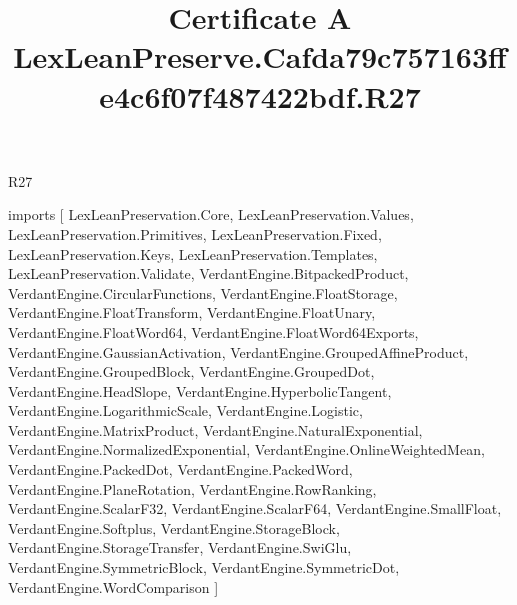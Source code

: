 \begin{lexlean}{R27}
\title{Certificate A LexLeanPreserve.Cafda79c757163ffe4c6f07f487422bdf.R27}
\begin{coremodule}
imports [
  LexLeanPreservation.Core,
  LexLeanPreservation.Values,
  LexLeanPreservation.Primitives,
  LexLeanPreservation.Fixed,
  LexLeanPreservation.Keys,
  LexLeanPreservation.Templates,
  LexLeanPreservation.Validate,
  VerdantEngine.BitpackedProduct,
  VerdantEngine.CircularFunctions,
  VerdantEngine.FloatStorage,
  VerdantEngine.FloatTransform,
  VerdantEngine.FloatUnary,
  VerdantEngine.FloatWord64,
  VerdantEngine.FloatWord64Exports,
  VerdantEngine.GaussianActivation,
  VerdantEngine.GroupedAffineProduct,
  VerdantEngine.GroupedBlock,
  VerdantEngine.GroupedDot,
  VerdantEngine.HeadSlope,
  VerdantEngine.HyperbolicTangent,
  VerdantEngine.LogarithmicScale,
  VerdantEngine.Logistic,
  VerdantEngine.MatrixProduct,
  VerdantEngine.NaturalExponential,
  VerdantEngine.NormalizedExponential,
  VerdantEngine.OnlineWeightedMean,
  VerdantEngine.PackedDot,
  VerdantEngine.PackedWord,
  VerdantEngine.PlaneRotation,
  VerdantEngine.RowRanking,
  VerdantEngine.ScalarF32,
  VerdantEngine.ScalarF64,
  VerdantEngine.SmallFloat,
  VerdantEngine.Softplus,
  VerdantEngine.StorageBlock,
  VerdantEngine.StorageTransfer,
  VerdantEngine.SwiGlu,
  VerdantEngine.SymmetricBlock,
  VerdantEngine.SymmetricDot,
  VerdantEngine.WordComparison
]


\end{coremodule}
\end{lexlean}
